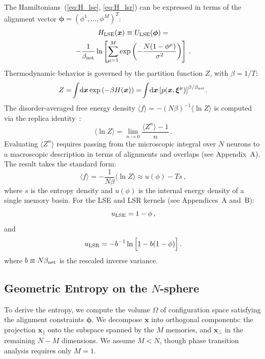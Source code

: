 \documentclass{article}
\newcommand{\dd}{{\mathrm{d}}}
\theoremstyle{plain}
\theoremstyle{definition}
\theoremstyle{remark}
\begin{document}
The Hamiltonians~(\ref{eq:H_lse}, \ref{eq:H_lsr}) can be expressed in terms of the alignment vector $\bm{\phi} = (\phi^1, \dots, \phi^M)^T$:
\begin{multline}
    H_{\rm LSE}(\bm{x}) \equiv U_{\rm LSE}(\bm{\phi}) = \\ -\frac{1}{\beta_{\rm net}} \ln \left[ \sum_{\mu=1}^M \exp\left( -\frac{N(1 - \phi^\mu)}{\sigma^2} \right) \right]\,.
\end{multline}
Thermodynamic behavior is governed by the partition function $Z$, with $\beta = 1/T$:
\begin{equation}
    Z = \!\int\!\dd \bm{x} \exp\left( -\beta H(\bm{x}) \right) = \!\int\! \dd \bm{x} \left[ p(\bm{x}, \bm{\xi}^\mu) \right]^{\beta/\beta_{\rm net}}\!.
    \label{eq:partition}
\end{equation}
The disorder-averaged free energy density $\langle f \rangle = -(N\beta)^{-1} \langle \ln Z \rangle$ is computed via the replica identity~\citep{sk75}:
\begin{equation}
    \langle \ln Z \rangle = \lim_{n \to 0} \frac{\langle Z^n \rangle - 1}{n}\,.
    \label{eq:limit}
\end{equation}
Evaluating $\langle Z^n \rangle$ requires passing from the microscopic integral over $N$ neurons to a macroscopic description in terms of alignments and overlaps (see Appendix~A). The result takes the standard form:
\begin{equation}
    \langle f \rangle = -\frac{1}{N\beta} \langle \ln Z \rangle 
    \approx  u(\phi) - T s\,,
\end{equation}
where $s$ is the entropy density and $u(\phi)$ is the internal energy density of a single memory basin. For the LSE and LSR kernels (see Appendices~A and~B):
\begin{equation}
    u_{\rm LSE} = 1-\phi\,,
    \label{eq:u_lse}
\end{equation}
and 
\begin{equation}
    u_{\rm LSR} = -b^{-1} \ln \Big[1 - b (1-\phi) \Big]\,.
    \label{eq:u_lsr}
\end{equation}
where $b\equiv N \beta_{\rm net}$ is the rescaled inverse variance.

\subsection{Geometric Entropy on the $N$-sphere}

To derive the entropy, we compute the volume $\Omega$ of configuration space satisfying the alignment constraints $\bm{\phi}$. We decompose $\bm{x}$ into orthogonal components: the projection $\bm{x}_{\parallel}$ onto the subspace spanned by the $M$ memories, and $\bm{x}_{\perp}$ in the remaining $N-M$ dimensions. We assume $M < N$, though phase transition analysis requires only $M=1$.
\end{document}
